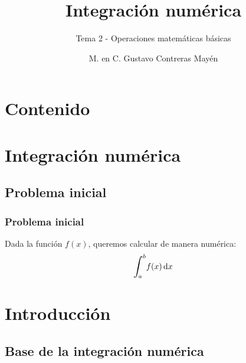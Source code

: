 \documentclass[12pt]{beamer}
\title{\large{Integración numérica}}
\subtitle{Tema 2 - Operaciones matemáticas básicas}
\author{M. en C. Gustavo Contreras Mayén}
\date{}
\begin{document}
\maketitle

\section*{Contenido}

\section{Integración numérica}
\subsection{Problema inicial}

\begin{frame}
\frametitle{Problema inicial}
Dada la función $f (x)$, queremos calcular de manera numérica:
\begin{align*}
\scaleint{6ex}_{\bs a}^{b} f (x) \dd{x}
\end{align*}
\end{frame}

\section{Introducción}
\subsection{Base de la integración numérica}
\end{document}
